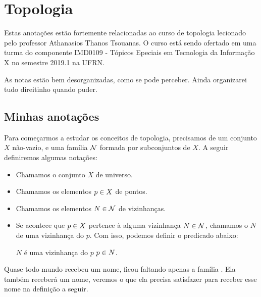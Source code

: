\chapter{Topologia}
Estas anotações estão fortemente relacionadas ao curso de topologia lecionado pelo professor Athanasios Thanos Tsouanas. O curso está sendo ofertado em uma turma do componente IMD0109 - Tópicos Epeciais em Tecnologia da Informação X no semestre 2019.1 na UFRN.

As notas estão bem desorganizadas, como se pode perceber. Ainda organizarei tudo direitinho quando puder.

\section{Minhas anotações}
Para começarmos a estudar os conceitos de topologia, precisamos de um conjunto $X$ não-vazio, e uma família $\mathcal{N}$ formada por subconjuntos de $X$. A seguir definiremos algumas notações:
\begin{itemize}
	\item Chamamos o conjunto $X$ de universo.
	\item Chamamos os elementos $p \in X$ de pontos.
	\item Chamamos os elementos $N \in \mathcal{N}$ de vizinhanças.
	\item Se acontece que $p \in X$ pertence à alguma vizinhança $N \in \mathcal{N}$, chamamos o $N$ de uma vizinhança do $p$. Com isso, podemos definir o predicado abaixo:
	\begin{center}
		$N$ é uma vizinhança do $p$ \sse $p \in N$.
	\end{center}
\end{itemize}

Quase todo mundo recebeu um nome, ficou faltando apenas a família . Ela também receberá um nome, veremos o que ela precisa satisfazer para receber esse nome na definição a seguir.

